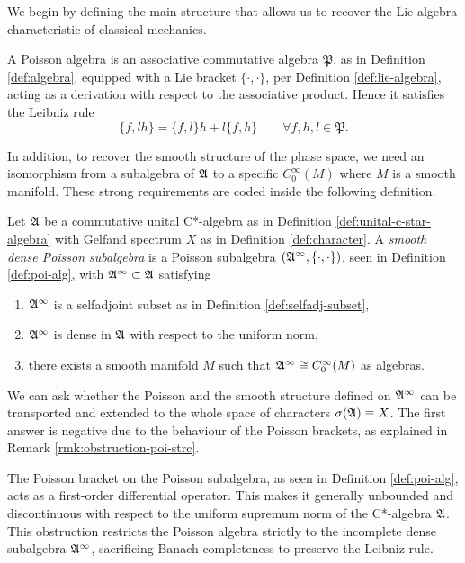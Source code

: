 	We begin by defining the main structure that allows us to recover the Lie algebra characteristic of classical mechanics.
	
	\begin{definition}\label{def:poi-alg}
		A Poisson algebra is an associative commutative algebra \(\mathfrak P\), as in Definition \ref{def:algebra}, equipped with a Lie bracket \(\{\cdot,\cdot\}\), per Definition \ref{def:lie-algebra}, acting as a derivation with respect to the associative product. Hence it satisfies the Leibniz rule
		\[
		\{f, lh\} = \{f, l\}h + l\{f, h\} \qquad \forall f, h, l \in \mathfrak P.
		\]
	\end{definition}
	
	In addition, to recover the smooth structure of the phase space, we need an isomorphism from a subalgebra of $\mathfrak{A}$ to a specific $C^\infty_0(M)$ where $M$ is a smooth manifold. These strong requirements are coded inside the following definition.
	
	\begin{definition}\label{def:smooth-subalgebra}
		Let \(\mathfrak{A}\) be a commutative unital C*-algebra as in Definition \ref{def:unital-c-star-algebra} with Gelfand spectrum \(X\) as in Definition \ref{def:character}. A \emph{smooth dense Poisson subalgebra} is a Poisson subalgebra $(\mathfrak{A}^\infty, \{\cdot,\cdot\})$, seen in Definition \ref{def:poi-alg}, with \(\mathfrak{A}^\infty \subset \mathfrak{A}\) satisfying
		\begin{enumerate}
			\item  \(\mathfrak{A}^\infty\) is a selfadjoint subset as in Definition \ref{def:selfadj-subset},
			\item \(\mathfrak{A}^\infty\) is dense in \(\mathfrak{A}\) with respect to the uniform norm,
			\item there exists a smooth manifold \(M\) such that \(\mathfrak{A}^\infty \cong C^\infty_0(M)\) as algebras.
		\end{enumerate}
	\end{definition}
	
	We can ask whether the Poisson and the smooth structure defined on $\mathfrak{A}^\infty$ can be transported and extended to the whole space of characters $\sigma(\mathfrak{A}) \equiv X$. The first answer is negative due to the behaviour of the Poisson brackets, as explained in Remark \ref{rmk:obstruction-poi-strc}.
	
	\begin{remark}\label{rmk:obstruction-poi-strc}
		The Poisson bracket on the Poisson subalgebra, as seen in Definition \ref{def:poi-alg}, acts as a first-order differential operator. This makes it generally unbounded and discontinuous with respect to the uniform supremum norm of the C*-algebra $\mathfrak{A}$. This obstruction restricts the Poisson algebra strictly to the incomplete dense subalgebra $\mathfrak{A}^\infty$, sacrificing Banach completeness to preserve the Leibniz rule.
	\end{remark}
	
